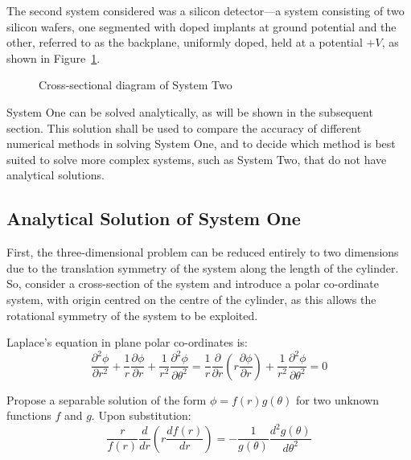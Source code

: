 \documentclass[11pt, a4paper]{article}
\newcommand{\be}{\begin{equation}}
\newcommand{\ee}{\end{equation}}
\begin{document}
The second system considered was a silicon detector---a system consisting of two
silicon wafers, one segmented with doped implants at ground potential and the other,
referred to as the backplane, uniformly doped, held at a potential $+V$, as shown
in Figure~\ref{fig:sys two}. 

\begin{figure}[h!]
\begin{center}
\end{center}
\caption{Cross-sectional diagram of System Two}
\label{fig:sys two}
\end{figure}

System One can be solved analytically, as will be shown in the subsequent section. This
solution shall be used to compare the accuracy of different numerical methods in solving
System One, and to decide which method is best suited to solve more complex systems, such
as System Two, that do not have analytical solutions.

\subsection{Analytical Solution of System One}

First, the three-dimensional problem can be reduced entirely to two
dimensions due to the translation symmetry of the system along the length of the
cylinder. So, consider a cross-section of the system and introduce a polar
co-ordinate system, with origin centred on the centre of the cylinder, as this
allows the rotational symmetry of the system to be exploited.

Laplace's equation in plane polar co-ordinates is: 
%
\be
\frac{\partial^2 \phi}{\partial r^2}+\frac{1}{r}\frac{\partial \phi}{\partial r}+\frac{1}{r^2}\frac{\partial^2 \phi}{\partial \theta^2}
= \frac{1}{r}\frac{\partial}{\partial r}(r \frac{\partial \phi}{\partial r}) + \frac{1}{r^2}\frac{\partial ^2 \phi}{\partial \theta^2}
= 0
\ee

Propose a separable solution of the form $\phi = f(r)g(\theta)$ for two unknown
functions $f$ and $g$. Upon substitution:
%
\be
\frac{r}{f(r)}\frac{d}{dr}(r \frac{df(r)}{dr}) =- \frac{1}{g(\theta)}\frac{d^2 g(\theta)}{d\theta^2}
\ee
\end{document}
